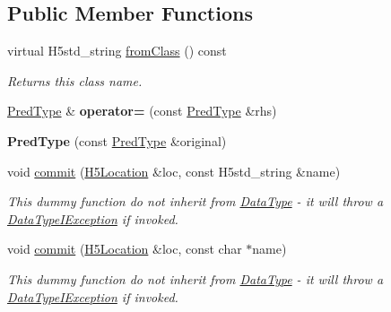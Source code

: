 \subsection*{Public Member Functions}
\begin{DoxyCompactItemize}
\item 
\mbox{\label{class_h5_1_1_pred_type_a75af31606c502672b4c55947f11a9632}} 
virtual H5std\+\_\+string \hyperlink{class_h5_1_1_pred_type_a75af31606c502672b4c55947f11a9632}{from\+Class} () const
\begin{DoxyCompactList}\small\item\em Returns this class name. \end{DoxyCompactList}\item 
\mbox{\label{class_h5_1_1_pred_type_a0e4df3713bf26bd68aa87e9a4fc41931}} 
\hyperlink{class_h5_1_1_pred_type}{Pred\+Type} \& {\bfseries operator=} (const \hyperlink{class_h5_1_1_pred_type}{Pred\+Type} \&rhs)
\item 
\mbox{\label{class_h5_1_1_pred_type_add6fc02da90b4237c83ff67ccdab20a4}} 
{\bfseries Pred\+Type} (const \hyperlink{class_h5_1_1_pred_type}{Pred\+Type} \&original)
\item 
\mbox{\label{class_h5_1_1_pred_type_a91ce8376cef135f4bf385e6f3177f18e}} 
void \hyperlink{class_h5_1_1_pred_type_a91ce8376cef135f4bf385e6f3177f18e}{commit} (\hyperlink{class_h5_1_1_h5_location}{H5\+Location} \&loc, const H5std\+\_\+string \&name)
\begin{DoxyCompactList}\small\item\em This dummy function do not inherit from \hyperlink{class_h5_1_1_data_type}{Data\+Type} -\/ it will throw a \hyperlink{class_h5_1_1_data_type_i_exception}{Data\+Type\+I\+Exception} if invoked. \end{DoxyCompactList}\item 
\mbox{\label{class_h5_1_1_pred_type_aeb3180a69dc65f7624035a7918f8c6f7}} 
void \hyperlink{class_h5_1_1_pred_type_aeb3180a69dc65f7624035a7918f8c6f7}{commit} (\hyperlink{class_h5_1_1_h5_location}{H5\+Location} \&loc, const char $\ast$name)
\begin{DoxyCompactList}\small\item\em This dummy function do not inherit from \hyperlink{class_h5_1_1_data_type}{Data\+Type} -\/ it will throw a \hyperlink{class_h5_1_1_data_type_i_exception}{Data\+Type\+I\+Exception} if invoked. \end{DoxyCompactList}\item 

\end{DoxyCompactItemize}
